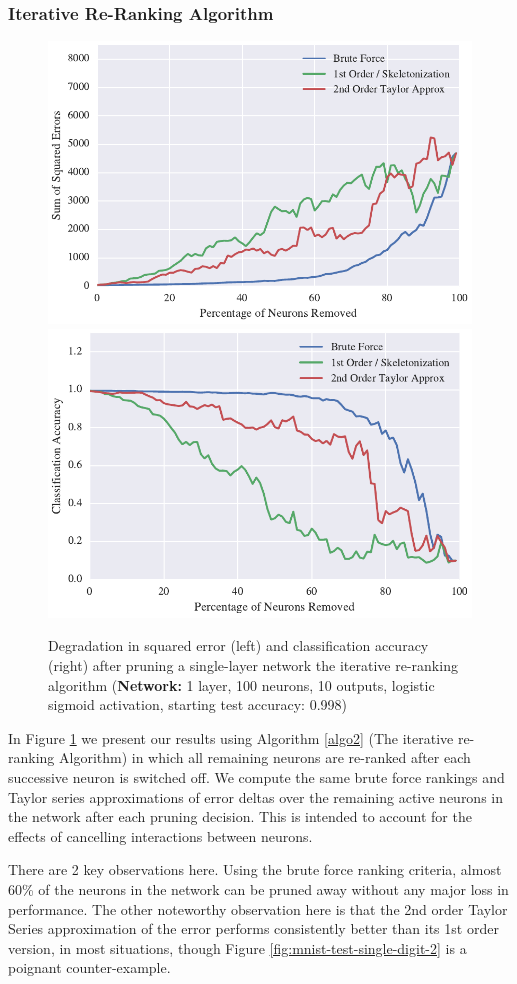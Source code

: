 \subsubsection{Iterative Re-Ranking Algorithm}
\begin{figure}[!ht]
\centering
\includegraphics[width=0.49\linewidth]{mnist-acc99-iterative-rerank-method.pdf}
\includegraphics[width=0.49\linewidth]{mnist-acc99-iterative-rerank-accuracy.pdf}
\caption{Degradation in squared error (left) and classification accuracy (right) after pruning a single-layer network the iterative re-ranking algorithm (\textbf{Network:} 1 layer, 100 neurons, 10 outputs, logistic sigmoid activation, starting test accuracy: 0.998)}
\label{fig:mnist-re-ranking-single-layer}
\end{figure}

In Figure \ref{fig:mnist-re-ranking-single-layer} we present our results using Algorithm \ref{algo2} (The iterative re-ranking Algorithm) in which all remaining neurons are re-ranked after each successive neuron is switched off. We compute the same brute force rankings and Taylor series approximations of error deltas over the remaining active neurons in the network after each pruning decision. This is intended to account for the effects of cancelling interactions between neurons. 

There are 2 key observations here. Using the brute force ranking criteria, almost 60\% of the neurons in the network can be pruned away without any major loss in performance. The other noteworthy observation here is that the 2nd order Taylor Series approximation of the error performs consistently better than its 1st order version, in most situations, though Figure \ref{fig:mnist-test-single-digit-2} is a poignant counter-example. 

